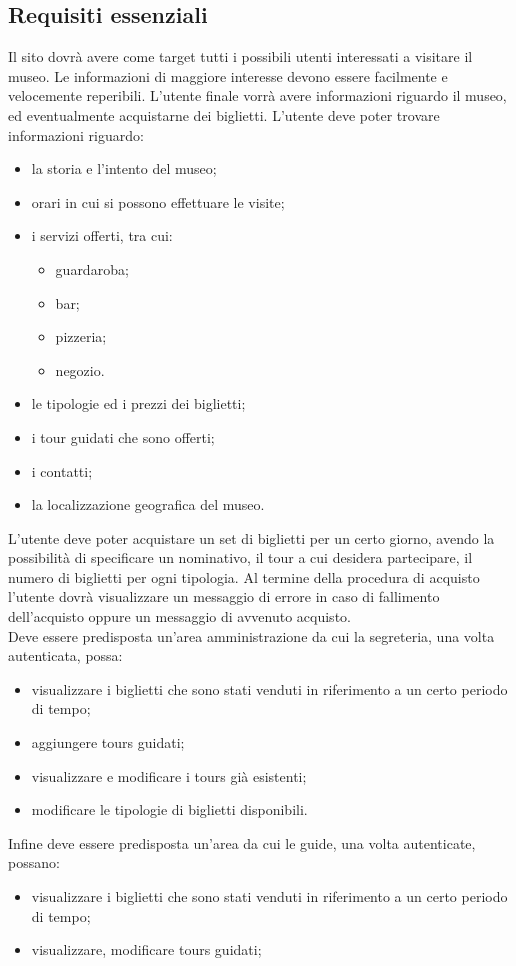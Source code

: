 \documentclass[10pt,a4paper,onecolumn]{article}
\begin{document}
\subsection{Requisiti essenziali}
Il sito dovrà avere come target tutti i possibili utenti interessati a visitare il museo.
Le informazioni di maggiore interesse devono essere facilmente e velocemente reperibili.
L'utente finale vorrà avere informazioni riguardo il museo, ed eventualmente acquistarne dei biglietti.
L'utente deve poter trovare informazioni riguardo:
\begin{itemize}
 \item la storia e l'intento del museo;
 \item orari in cui si possono effettuare le visite;
 \item i servizi offerti, tra cui:
	 \begin{itemize}
	 \item guardaroba;
	 \item bar;
	 \item pizzeria;
	 \item negozio.
	 \end{itemize}
 \item le tipologie ed i prezzi dei biglietti;
 \item i tour guidati che sono offerti;
 \item i contatti;
 \item la localizzazione geografica del museo.
 \end{itemize}
L'utente deve poter acquistare un set di biglietti per un certo giorno, avendo la possibilità di specificare un nominativo, il tour a cui desidera partecipare, il numero di biglietti per ogni tipologia. Al termine della procedura di acquisto l'utente dovrà visualizzare un messaggio di errore in caso di fallimento dell'acquisto oppure un messaggio di avvenuto acquisto.\\
 Deve essere predisposta un'area amministrazione da cui la segreteria, una volta autenticata, possa:
 \begin{itemize}
 \item visualizzare i biglietti che sono stati venduti in riferimento a un certo periodo di tempo;
 \item aggiungere tours guidati;
 \item visualizzare e modificare i tours già esistenti;
 \item modificare le tipologie di biglietti disponibili.
 \end{itemize}
 Infine deve essere predisposta un'area da cui le guide, una volta autenticate, possano:
 \begin{itemize}
 	\item visualizzare i biglietti che sono stati venduti in riferimento a un certo periodo di tempo;
 	\item visualizzare, modificare tours guidati;
 \end{itemize}
\end{document}
